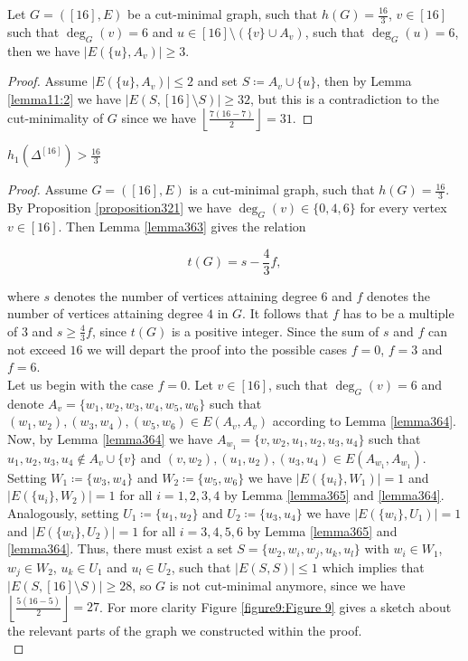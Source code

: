 \begin{lem}\label{lemma368}
Let \(G=([16],E)\) be a cut-minimal graph, such that \(h(G)=\frac{16}{3}\), \(v\in [16]\) such that \(\deg_G(v)=6\) and \(u\in [16]\setminus (\{v\}\cup A_v)\), such that \(\deg_G(u)=6\), then we have \(|E(\{u\},A_v)|\geq 3\).
\begin{proof}
Assume \(|E(\{u\},A_v)|\leq 2\) and set \(S\coloneqq A_v\cup\{u\}\), then by Lemma \ref{lemma11:2} we have \(|E(S,[16]\setminus S)|\geq 32\), but this is a contradiction to the cut-minimality of \(G\) since we have \(\left\lfloor\frac{7(16-7)}{2}\right\rfloor=31\).
\end{proof}
\end{lem}

\begin{thm}\label{theoremn=16}
\(h_1(\Delta^{[16]})>\frac{16}{3}\)
\begin{proof}
Assume \(G=([16],E)\) is a cut-minimal graph, such that \(h(G)=\frac{16}{3}\). By Proposition \ref{proposition321} we have \(\deg_G(v)\in\{0,4,6\}\) for every vertex \(v\in [16]\). Then Lemma \ref{lemma363} gives the relation

\begin{equation}\label{equation361}
t(G)=s-\frac{4}{3}f,
\end{equation}

where \(s\) denotes the number of vertices attaining degree \(6\) and \(f\) denotes the number of vertices attaining degree \(4\) in \(G\). It follows that \(f\) has to be a multiple of \(3\) and \(s\geq\frac{4}{3}f\), since \(t(G)\) is a positive integer. Since the sum of \(s\) and \(f\) can not exceed \(16\) we will depart the proof into the possible cases \(f=0\), \(f=3\) and \(f=6\).\\
Let us begin with the case \(f=0\). Let \(v\in [16]\), such that \(\deg_G(v)=6\) and denote \(A_v=\{w_1,w_2,w_3,w_4,w_5,w_6\}\) such that \((w_1,w_2),(w_3,w_4),(w_5,w_6)\in E(A_v,A_v)\) according to Lemma \ref{lemma364}. Now, by Lemma \ref{lemma364} we have \(A_{w_1}=\{v,w_2,u_1,u_2,u_3,u_4\}\) such that \(u_1,u_2,u_3,u_4\notin A_v\cup \{v\}\) and \((v,w_2),(u_1,u_2),(u_3,u_4)\in E(A_{w_1},A_{w_1})\). Setting \(W_1\coloneqq\{w_3,w_4\}\) and \(W_2\coloneqq\{w_5,w_6\}\) we have \(|E(\{u_i\},W_1)|=1\) and\\
\(|E(\{u_i\},W_2)|=1\) for all \(i=1,2,3,4\) by Lemma \ref{lemma365} and \ref{lemma364}. Analogously, setting \(U_1\coloneqq\{u_1,u_2\}\) and \(U_2\coloneqq\{u_3,u_4\}\) we have \(|E(\{w_i\},U_1)|=1\) and \(|E(\{w_i\},U_2)|=1\) for all \(i=3,4,5,6\) by Lemma \ref{lemma365} and \ref{lemma364}. Thus, there must exist a set \(S=\{w_2,w_i,w_j,u_k,u_l\}\) with \(w_i\in W_1\), \(w_j\in W_2\), \(u_k\in U_1\) and \(u_l\in U_2\), such that \(|E(S,S)|\leq 1\) which implies that \(|E(S,[16]\setminus S)|\geq 28\), so \(G\) is not cut-minimal anymore, since we have \(\left\lfloor\frac{5(16-5)}{2}\right\rfloor=27\). For more clarity Figure \ref{figure9:Figure 9} gives a sketch about the relevant parts of the graph we constructed within the proof.\\


\end{proof}
\end{thm}
